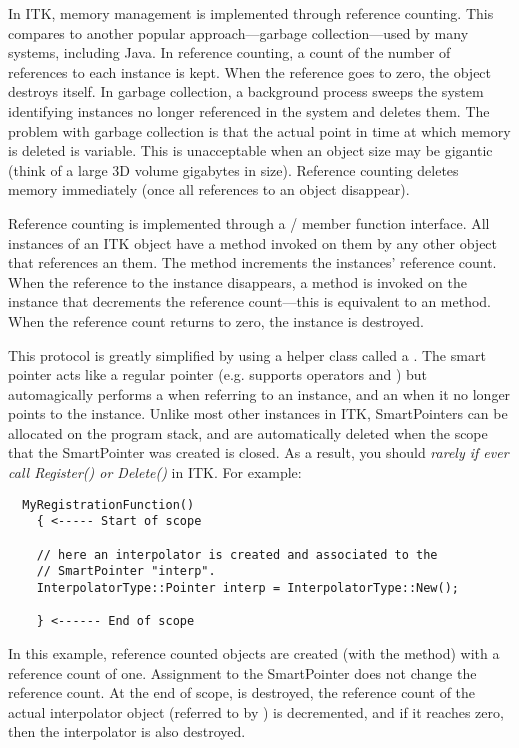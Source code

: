 In ITK, memory management is implemented through reference counting. This
compares to another popular approach---garbage collection---used
 by many
systems, including Java. In reference counting, a count of the number of
references to each instance is kept. When the reference goes to zero, the
object destroys itself. In garbage collection, a background process sweeps
the system identifying instances no longer referenced in the system and
deletes them. The problem with garbage collection is that the actual point in
time at which memory is deleted is variable. This is unacceptable when an
object size may be gigantic (think of a large 3D volume gigabytes in
size). Reference counting deletes memory immediately (once all references to
an object disappear).

Reference counting is implemented through a /
member function interface.  All instances of an ITK object have a
 method invoked on them by any other object that references
an them. The  method increments the instances' reference
count. When the reference to the instance disappears, a 
method is invoked on the instance that decrements the reference count---this
is equivalent to an  method. When the reference count
returns to zero, the instance is destroyed.

This protocol is greatly simplified by using a helper class called a
. The smart pointer acts like a regular pointer
(e.g. supports operators \code{->} and \code{*}) but automagically performs a
 when referring to an instance, and an 
when it no longer points to the instance.  Unlike most other instances in
ITK, SmartPointers can be allocated on the program stack, and are
automatically deleted when the scope that the SmartPointer was created
is closed. As a result, you should \emph{rarely if ever call Register() or
Delete()} in ITK. For example:

\small
\begin{verbatim}
  MyRegistrationFunction()
    { <----- Start of scope

    // here an interpolator is created and associated to the
    // SmartPointer "interp".
    InterpolatorType::Pointer interp = InterpolatorType::New();

    } <------ End of scope
\end{verbatim}
\normalsize

In this example, reference counted objects are created (with the 
method) with a reference count of one. Assignment to the SmartPointer
 does not change the reference count. At the end of scope,
 is destroyed, the reference count of the actual interpolator
object (referred to by ) is decremented, and if it reaches zero,
then the interpolator is also destroyed.

